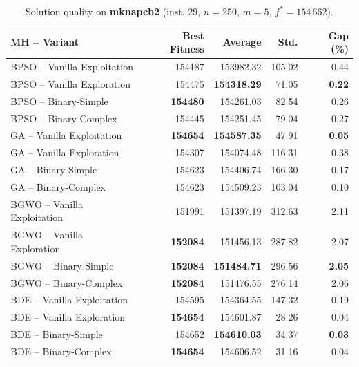 \documentclass[journal,article,submit,moreauthors]{Definitions/mdpi}
\begin{document}
\begin{table}[htbp]
  \centering
  \small
  \caption{Solution quality on \textbf{mknapcb2} (inst. 29, $n=250$, $m=5$, $f^*=154\,662$).}
  \label{tab:calidad_mknapcb2_29}
  \begin{tabular}{lrrrr}
    \toprule
    \textbf{MH -- Variant} &
    \textbf{Best Fitness} &
    \textbf{Average} &
    \textbf{Std.} &
    \textbf{Gap (\%)} \\
    \midrule
    BPSO -- Vanilla Exploitation &         154187 &        153982.32 & 105.02 &         0.44 \\
    BPSO -- Vanilla Exploration  &         154475 & \textbf{154318.29} &  71.05 & \textbf{0.22} \\
    BPSO -- Binary-Simple        & \textbf{154480} &        154261.03 &  82.54 &         0.26 \\
    BPSO -- Binary-Complex       &         154445 &        154251.45 &  79.04 &         0.27 \\
    \midrule
    GA -- Vanilla Exploitation   & \textbf{154654} & \textbf{154587.35} &  47.91 & \textbf{0.05} \\
    GA -- Vanilla Exploration    &         154307 &        154074.48 & 116.31 &         0.38 \\
    GA -- Binary-Simple          &         154623 &        154406.74 & 166.30 &         0.17 \\
    GA -- Binary-Complex         &         154623 &        154509.23 & 103.04 &         0.10 \\
    \midrule
    BGWO -- Vanilla Exploitation &         151991 &        151397.19 & 312.63 &         2.11 \\
    BGWO -- Vanilla Exploration  & \textbf{152084} &        151456.13 & 287.82 &         2.07 \\
    BGWO -- Binary-Simple        & \textbf{152084} & \textbf{151484.71} & 296.56 & \textbf{2.05} \\
    BGWO -- Binary-Complex       & \textbf{152084} &        151476.55 & 276.14 &         2.06 \\
    \midrule
    BDE -- Vanilla Exploitation  &         154595 &        154364.55 & 147.32 &         0.19 \\
    BDE -- Vanilla Exploration   & \textbf{154654} &        154601.87 &  28.26 &         0.04 \\
    BDE -- Binary-Simple         &         154652 & \textbf{154610.03} &  34.37 & \textbf{0.03} \\
    BDE -- Binary-Complex        & \textbf{154654} &        154606.52 &  31.16 &         0.04 \\
    \bottomrule
  \end{tabular}
\end{table}
\end{document}

